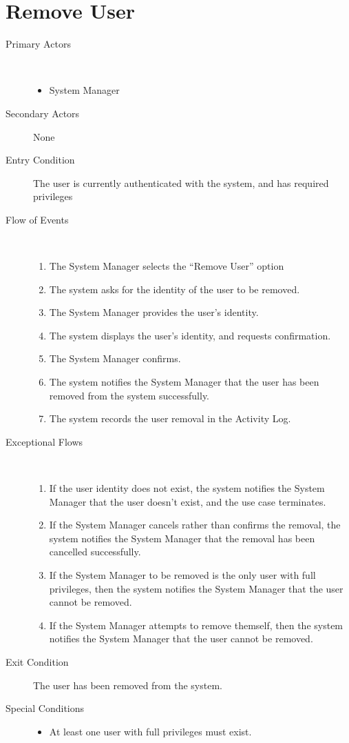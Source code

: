 \documentclass[a4paper,10pt]{report}
\begin{document}
\section{Remove User}
\begin{description}
\item[Primary Actors] \
  \begin{itemize}
  \item System Manager
  \end{itemize}
\item[Secondary Actors] None
\item[Entry Condition]
  The user is currently authenticated with the system, and has required privileges
\item[Flow of Events] \
  \begin{enumerate}
  \item The System Manager selects the ``Remove User'' option
  \item The system asks for the identity of the user to be removed.
  \item The System Manager provides the user's identity.
  \item The system displays the user's identity, and requests confirmation.
  \item The System Manager confirms.
  \item The system notifies the System Manager that the user has been removed from the system successfully.
    \item The system records the user removal in the Activity Log.
  \end{enumerate}
\item[Exceptional Flows] \
  \begin{enumerate}
  \item If the user identity does not exist, the system notifies the System Manager that the user doesn't exist, and the use case terminates.
  \item If the System Manager cancels rather than confirms the removal, the system notifies the System Manager that the removal has been cancelled successfully.
  \item If the System Manager to be removed is the only user with full privileges, then the system notifies the System Manager that the user cannot be removed.
  \item If the System Manager attempts to remove themself, then the system notifies the System Manager that the user cannot be removed.
  \end{enumerate}
\item[Exit Condition]
  The user has been removed from the system.
\item[Special Conditions]
\begin{itemize}
\item At least one user with full privileges must exist.
\end{itemize}
\end{description}
\end{document}
